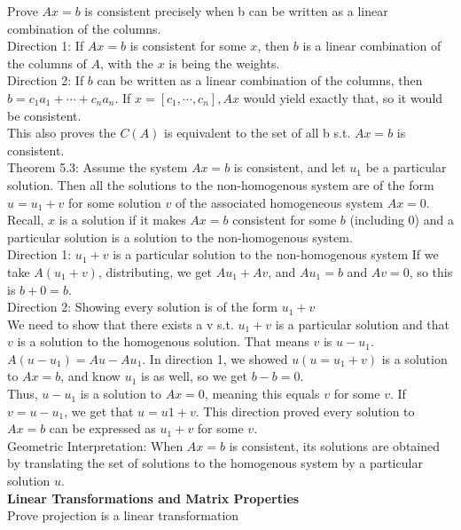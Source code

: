 \documentclass[12pt]{article}
\begin{document}
Prove $Ax=b$ is consistent precisely when b can be written as a linear combination of the columns.\\
Direction 1: If $Ax=b$ is consistent for some $x$, then $b$ is a linear combination of the columns of $A$, with the $x$ is being the weights.\\
Direction 2: If $b$ can be written as a linear combination of the columns, then $b = c_1a_1+\cdots+c_na_n$. If $x = [c_1,\cdots,c_n], Ax$ would yield exactly that, so it would be consistent.\\
This also proves the $C(A)$ is equivalent to the set of all b s.t. $Ax=b$ is consistent.\\

Theorem 5.3: Assume the system $Ax = b$ is consistent, and let $u_1$ be a particular solution. Then all the solutions to the non-homogenous system are of the form $u = u_1 + v$ for some solution $v$ of the associated homogeneous system $Ax = 0$.\\ Recall, $x$ is a solution if it makes $Ax=b$ consistent for some $b$ (including 0) and a particular solution is a solution to the non-homogenous system.\\
Direction 1: $u_1+v$ is a particular solution to the non-homogenous system
If we take $A(u_1+v)$, distributing, we get $Au_1+Av$, and $Au_1=b$ and $Av = 0$, so this is $b+0 = b$.\\
Direction 2: Showing every solution is of the form $u_1+v$\\
We need to show that there exists a v s.t. $u_1+v$ is a particular solution and that $v$ is a solution to the homogenous solution. That means $v$ is $u-u_1$.\\
$A(u-u_1) = Au - Au_1$. In direction 1, we showed $u (u = u_1+v)$ is a solution to $Ax=b$, and know $u_1$ is as well, so we get $b - b = 0$.\\
Thus, $u-u_1$ is a solution to $Ax=0$, meaning this equals $v$ for some $v$. If $v = u-u_1$, we get that $u=u1+v$. This direction proved every solution to $Ax=b$ can be expressed as $u_1+v$ for some $v$.\\
Geometric Interpretation: When $Ax=b$ is consistent, its solutions are obtained by translating the set of solutions to the homogenous system by a particular solution $u$.\\


\textbf{Linear Transformations and Matrix Properties}\\

Prove projection is a linear transformation\\
\end{document}
